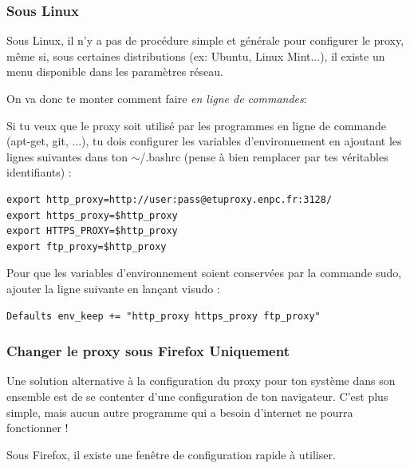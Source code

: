 \documentclass{../templates/enpc-ki/ki020}
\begin{document}
\newpage
      \subsubsection{Sous Linux}
        Sous Linux, il n’y a pas de procédure simple et générale pour configurer le proxy, même si, sous certaines distributions (ex: Ubuntu, Linux Mint...), il existe un menu disponible dans les paramètres réseau.

        On va donc te monter comment faire \emph{en ligne de commandes}:

        Si tu veux que le proxy soit utilisé par les programmes en ligne de commande (apt-get, git, ...), tu dois configurer les variables d’environnement en ajoutant les lignes suivantes dans ton $\sim$/.bashrc (pense à bien remplacer par tes véritables identifiants) :

        \begin{verbatim}
export http_proxy=http://user:pass@etuproxy.enpc.fr:3128/
export https_proxy=$http_proxy
export HTTPS_PROXY=$http_proxy
export ftp_proxy=$http_proxy
        \end{verbatim}

        Pour que les variables d’environnement soient conservées par la commande sudo, ajouter la ligne suivante en lançant visudo :
        \begin{verbatim}
Defaults env_keep += "http_proxy https_proxy ftp_proxy"
        \end{verbatim}

\newpage
      \subsubsection{Changer le proxy sous Firefox Uniquement}
        Une solution alternative à la configuration du proxy pour ton système dans son ensemble est de se contenter d’une configuration de ton navigateur. C’est plus simple, mais aucun autre programme qui a besoin d’internet ne pourra fonctionner !

        Sous Firefox, il existe une fenêtre de configuration rapide à utiliser.
\end{document}
